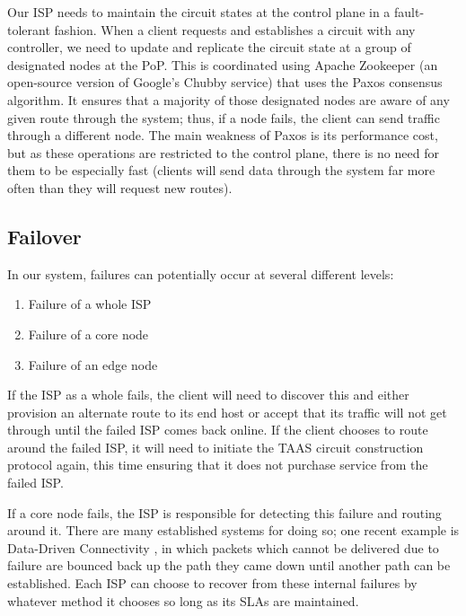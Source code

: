 \documentclass{article}
\begin{document}
Our ISP needs to maintain the circuit states at the control plane in a
fault-tolerant fashion. When a client requests and establishes a
circuit with any controller, we need to update and replicate the
circuit state at a group of designated nodes at the PoP. This is
coordinated using Apache Zookeeper (an open-source version of Google's
Chubby service) that uses the Paxos consensus algorithm. It ensures
that a majority of those designated nodes are aware of any given route
through the system; thus, if a node fails, the client can send traffic
through a different node. The main weakness of Paxos is its
performance cost, but as these operations are restricted to the
control plane, there is no need for them to be especially fast
(clients will send data through the system far more often than they
will request new routes).

\subsection{Failover}

In our system, failures can potentially occur at several different
levels:

\begin{enumerate}
\item Failure of a whole ISP
\item Failure of a core node
\item Failure of an edge node
\end{enumerate}

If the ISP as a whole fails, the client will need to discover this and
either provision an alternate route to its end host or accept that its
traffic will not get through until the failed ISP comes back
online. If the client chooses to route around the failed ISP, it will
need to initiate the TAAS circuit construction protocol again, this
time ensuring that it does not purchase service from the failed ISP.

If a core node fails, the ISP is responsible for detecting this
failure and routing around it. There are many established systems for
doing so; one recent example is Data-Driven Connectivity \cite{ddc},
in which packets which cannot be delivered due to failure are bounced
back up the path they came down until another path can be
established. Each ISP can choose to recover from these internal
failures by whatever method it chooses so long as its SLAs are
maintained.
\end{document}
